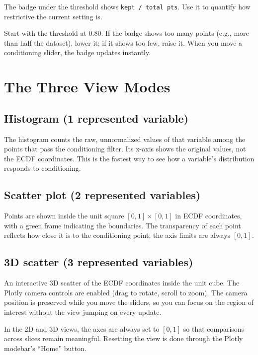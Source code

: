 \documentclass[11pt,a4paper]{article}
\begin{document}
The badge under the threshold shows \texttt{kept / total pts}. Use it to quantify how restrictive the current setting is.

\begin{tipbox}
Start with the threshold at 0.80. If the badge shows too many points (e.g., more than half the dataset), lower it; if it shows too few, raise it. When you move a conditioning slider, the badge updates instantly.
\end{tipbox}

\section{The Three View Modes}

\subsection{Histogram (1 represented variable)}

The histogram counts the raw, unnormalized values of that variable among the points that pass the conditioning filter. Its x-axis shows the original values, not the ECDF coordinates. This is the fastest way to see how a variable's distribution responds to conditioning.

\subsection{Scatter plot (2 represented variables)}

Points are shown inside the unit square $[0,1]\times[0,1]$ in ECDF coordinates, with a green frame indicating the boundaries. The transparency of each point reflects how close it is to the conditioning point; the axis limits are always $[0,1]$.

\subsection{3D scatter (3 represented variables)}

An interactive 3D scatter of the ECDF coordinates inside the unit cube. The Plotly camera controls are enabled (drag to rotate, scroll to zoom). The camera position is preserved while you move the sliders, so you can focus on the region of interest without the view jumping on every update.

\begin{notebox}
In the 2D and 3D views, the axes are always set to $[0,1]$ so that comparisons across slices remain meaningful. Resetting the view is done through the Plotly modebar's ``Home'' button.
\end{notebox}
\end{document}
